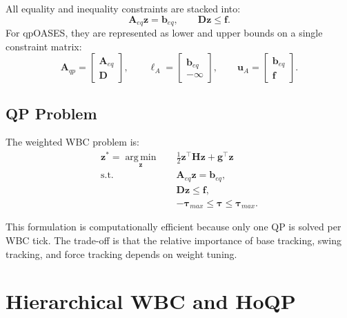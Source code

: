 \documentclass[11pt,a4paper]{article}
\newcommand{\argmin}{\operatorname*{arg\,min}}
\begin{document}
All equality and inequality constraints are stacked into:
\begin{equation}
	\bm{A}_{eq}\bm{z}=\bm{b}_{eq},
	\qquad
	\bm{D}\bm{z}\leq \bm{f}.
\end{equation}
For qpOASES, they are represented as lower and upper bounds on a single constraint matrix:
\begin{equation}
	\bm{A}_{qp}
	=
	\begin{bmatrix}
		\bm{A}_{eq}\\
		\bm{D}
	\end{bmatrix},
	\qquad
	\bm{\ell}_{A}
	=
	\begin{bmatrix}
		\bm{b}_{eq}\\
		-\infty
	\end{bmatrix},
	\qquad
	\bm{u}_{A}
	=
	\begin{bmatrix}
		\bm{b}_{eq}\\
		\bm{f}
	\end{bmatrix}.
\end{equation}

\subsection{QP Problem}

The weighted WBC problem is:
\begin{equation}
	\boxed{
		\begin{aligned}
			\bm{z}^*
			=
			\argmin_{\bm{z}}\quad
			&
			\frac{1}{2}\bm{z}^{\top}\bm{H}\bm{z}
			+
			\bm{g}^{\top}\bm{z}\\
			\text{s.t.}\quad
			&
			\bm{A}_{eq}\bm{z}=\bm{b}_{eq},\\
			&
			\bm{D}\bm{z}\leq\bm{f},\\
			&
			-\bm{\tau}_{max}\leq\bm{\tau}\leq\bm{\tau}_{max}.
		\end{aligned}
	}
\end{equation}

This formulation is computationally efficient because only one QP is solved per WBC tick. The trade-off is that the relative importance of base tracking, swing tracking, and force tracking depends on weight tuning.


\section{Hierarchical WBC and HoQP}
\label{sec:hierarchical_wbc}
\end{document}

